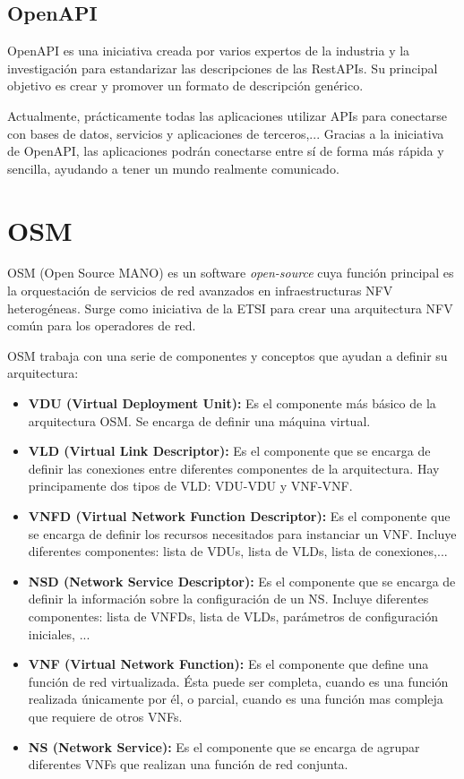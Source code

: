 \subsection{OpenAPI}
\label{subsec:openapi}

OpenAPI es una iniciativa creada por varios expertos de la industria y la investigación para estandarizar las descripciones de las RestAPIs. Su principal objetivo es crear y promover un formato de descripción genérico.

Actualmente, prácticamente todas las aplicaciones utilizar APIs para conectarse con bases de datos, servicios y aplicaciones de terceros,... Gracias a la iniciativa de OpenAPI, las aplicaciones podrán conectarse entre sí de forma más rápida y sencilla, ayudando a tener un mundo realmente comunicado.

\section{OSM}
\label{sec:osm}

OSM (Open Source MANO) es un software \textit{open-source} cuya función principal es la orquestación de servicios de red avanzados en infraestructuras NFV heterogéneas. Surge como iniciativa de la ETSI para crear una arquitectura NFV común para los operadores de red.

OSM trabaja con una serie de componentes y conceptos que ayudan a definir su arquitectura:

\begin{itemize}
	\item \textbf{VDU (Virtual Deployment Unit):} Es el componente más básico de la arquitectura OSM. Se encarga de definir una máquina virtual. 
	
	\item \textbf{VLD (Virtual Link Descriptor):} Es el componente que se encarga de definir las conexiones entre diferentes componentes de la arquitectura. Hay principamente dos tipos de VLD: VDU-VDU y VNF-VNF.
	
	\item \textbf{VNFD (Virtual Network Function Descriptor):} Es el componente que se encarga de definir los recursos necesitados para instanciar un VNF. Incluye diferentes componentes: lista de VDUs, lista de VLDs, lista de conexiones,...
	
	\item \textbf{NSD (Network Service Descriptor):} Es el componente que se encarga de definir la información sobre la configuración de un NS. Incluye diferentes componentes: lista de VNFDs, lista de VLDs, parámetros de configuración iniciales, ...
	
	\item \textbf{VNF (Virtual Network Function):} Es el componente que define una función de red virtualizada. Ésta puede ser completa, cuando es una función realizada únicamente por él, o parcial, cuando es una función mas compleja que requiere de otros VNFs.
	
	\item \textbf{NS (Network Service):} Es el componente que se encarga de agrupar diferentes VNFs que realizan una función de red conjunta.
\end{itemize}

